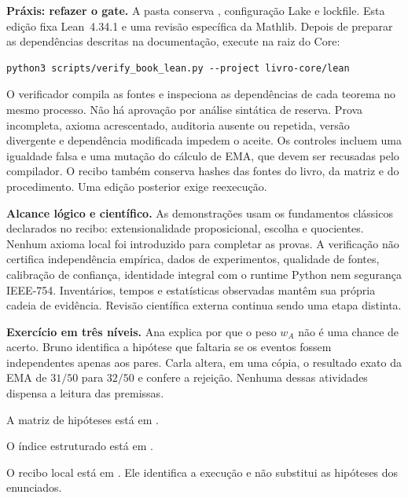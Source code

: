 \begin{metodo}
\textbf{Práxis: refazer o gate.} A pasta  conserva
, configuração Lake e lockfile. Esta edição fixa
Lean~4.34.1 e uma revisão específica da Mathlib. Depois de preparar as
dependências descritas na documentação, execute na raiz do Core:
\begin{verbatim}
python3 scripts/verify_book_lean.py --project livro-core/lean
\end{verbatim}
O verificador compila as fontes e inspeciona as dependências de cada teorema
no mesmo processo. Não há aprovação por análise sintática de reserva.
Prova incompleta, axioma acrescentado, auditoria ausente ou repetida,
versão divergente e dependência modificada impedem o aceite. Os controles
incluem uma igualdade falsa e uma mutação do cálculo de EMA, que devem ser
recusadas pelo compilador. O recibo também conserva hashes das fontes do
livro, da matriz e do procedimento. Uma edição posterior exige reexecução.
\end{metodo}

\begin{aviso}
\textbf{Alcance lógico e científico.} As demonstrações usam os fundamentos
clássicos declarados no recibo: extensionalidade proposicional, escolha e
quocientes. Nenhum axioma local foi introduzido para completar as provas.
A verificação não certifica independência empírica, dados de experimentos,
qualidade de fontes, calibração de confiança, identidade integral com o
runtime Python nem segurança IEEE-754. Inventários, tempos e estatísticas
observadas mantêm sua própria cadeia de evidência. Revisão científica
externa continua sendo uma etapa distinta.
\end{aviso}

\begin{resultado}
\textbf{Exercício em três níveis.} Ana explica por que o peso $w_A$ não é
uma chance de acerto. Bruno identifica a hipótese que faltaria se os eventos
fossem independentes apenas aos pares. Carla altera, em uma cópia, o resultado
exato da EMA de $31/50$ para $32/50$ e confere a rejeição. Nenhuma dessas
atividades dispensa a leitura das premissas.
\end{resultado}

A matriz de hipóteses está em .
\par O índice estruturado está em .
\par O recibo local está em .
Ele identifica a execução e não substitui as hipóteses dos enunciados.


